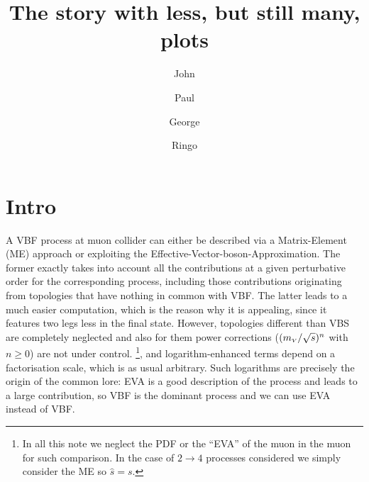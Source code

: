 \documentclass[a4paper,11pt]{article}
\title{The story with less, but still many, plots}
\author[a]{John}
\author[a]{Paul}
\author[a]{George}
\author[a]{Ringo}
\affiliation[a]{Abbey Rd.~London, Regno Unito
}
\begin{document}
\maketitle
\flushbottom


\section{Intro}

A VBF process at muon collider can either be described via a Matrix-Element (ME) approach or exploiting the Effective-Vector-boson-Approximation. 
The former exactly takes into account all the contributions at a given perturbative order for the corresponding process, including those   contributions originating from  topologies that have nothing in common with VBF.  The latter leads to a much easier computation, which is the reason why it is appealing, since it features two legs less in the final state. However, topologies different than VBS are completely neglected and also for them 
power corrections ($(m_{\scriptscriptstyle V}/\sqrt{s})^n$ with $n\ge 0$) are not under control. \footnote{In all this note we neglect the PDF or the ``EVA'' of the muon in the muon for such comparison. In the case of $2\to 4$ processes considered we simply consider the ME so $\hat s= s$.}, and logarithm-enhanced terms depend on a factorisation scale, which is as usual arbitrary. Such logarithms are precisely the origin of the common lore: EVA is a good description of the process and leads to a large contribution, so VBF is the dominant process and we can use EVA instead of VBF.
\end{document}
